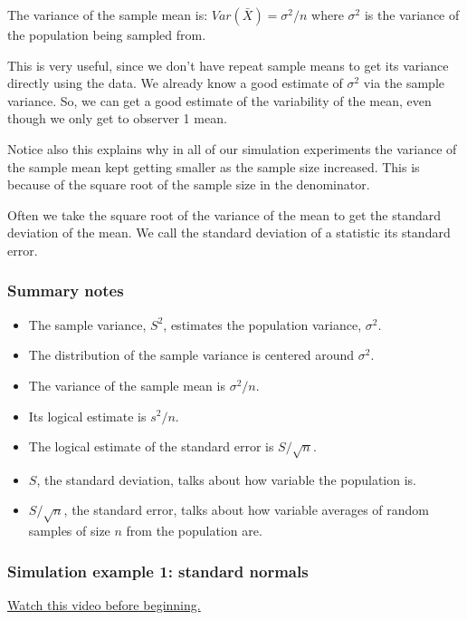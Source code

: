 \documentclass[]{article}
\begin{document}
The variance of the sample mean is: $Var(\bar X) = \sigma^2 / n$ where
$\sigma^2$ is the variance of the population being sampled from.

This is very useful, since we don't have repeat sample means to get its
variance directly using the data. We already know a good estimate of
$\sigma^2$ via the sample variance. So, we can get a good estimate of
the variability of the mean, even though we only get to observer 1 mean.

Notice also this explains why in all of our simulation experiments the
variance of the sample mean kept getting smaller as the sample size
increased. This is because of the square root of the sample size in the
denominator.

Often we take the square root of the variance of the mean to get the
standard deviation of the mean. We call the standard deviation of a
statistic its standard error.

\subsubsection{Summary notes}\label{summary-notes-2}

\begin{itemize}
\itemsep1pt\parskip0pt
\item
  The sample variance, $S^2$, estimates the population variance,
  $\sigma^2$.
\item
  The distribution of the sample variance is centered around $\sigma^2$.
\item
  The variance of the sample mean is $\sigma^2 / n$.
\item
  Its logical estimate is $s^2 / n$.
\item
  The logical estimate of the standard error is $S / \sqrt{n}$.
\item
  $S$, the standard deviation, talks about how variable the population
  is.
\item
  $S/\sqrt{n}$, the standard error, talks about how variable averages of
  random samples of size $n$ from the population are.
\end{itemize}

\subsubsection{Simulation example 1: standard
normals}\label{simulation-example-1-standard-normals}

\href{http://youtu.be/uPjHB9JjGKI?list=PLpl-gQkQivXiBmGyzLrUjzsblmQsLtkzJ}{Watch
this video before beginning.}
\end{document}
